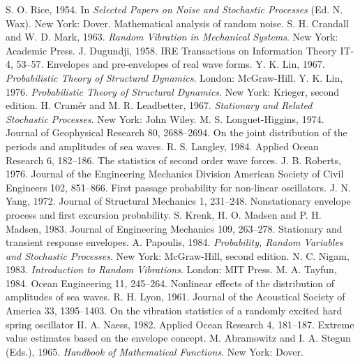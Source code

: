 \documentclass[12pt]{article}
\theoremstyle{plain}
\theoremstyle{definition}
\theoremstyle{remark}
\begin{document}
\begin{thebibliography}{99}
 S. O. Rice, 1954. In \textit{Selected Papers on Noise and Stochastic Processes} (Ed. N. Wax). New York: Dover. Mathematical analysis of random noise.
 S. H. Crandall and W. D. Mark, 1963. \textit{Random Vibration in Mechanical Systems}. New York: Academic Press.
 J. Dugundji, 1958. IRE Transactions on Information Theory IT-4, 53--57. Envelopes and pre-envelopes of real wave forms.
 Y. K. Lin, 1967. \textit{Probabilistic Theory of Structural Dynamics}. London: McGraw-Hill.
 Y. K. Lin, 1976. \textit{Probabilistic Theory of Structural Dynamics}. New York: Krieger, second edition.
 H. Cramér and M. R. Leadbetter, 1967. \textit{Stationary and Related Stochastic Processes}. New York: John Wiley.
 M. S. Longuet-Higgins, 1974. Journal of Geophysical Research 80, 2688--2694. On the joint distribution of the periods and amplitudes of sea waves.
 R. S. Langley, 1984. Applied Ocean Research 6, 182--186. The statistics of second order wave forces.
 J. B. Roberts, 1976. Journal of the Engineering Mechanics Division American Society of Civil Engineers 102, 851--866. First passage probability for non-linear oscillators.
 J. N. Yang, 1972. Journal of Structural Mechanics 1, 231--248. Nonstationary envelope process and first excursion probability.
 S. Krenk, H. O. Madsen and P. H. Madsen, 1983. Journal of Engineering Mechanics 109, 263--278. Stationary and transient response envelopes.
 A. Papoulis, 1984. \textit{Probability, Random Variables and Stochastic Processes}. New York: McGraw-Hill, second edition.
 N. C. Nigam, 1983. \textit{Introduction to Random Vibrations}. London: MIT Press.
 M. A. Tayfun, 1984. Ocean Engineering 11, 245--264. Nonlinear effects of the distribution of amplitudes of sea waves.
 R. H. Lyon, 1961. Journal of the Acoustical Society of America 33, 1395--1403. On the vibration statistics of a randomly excited hard spring oscillator II.
 A. Naess, 1982. Applied Ocean Research 4, 181--187. Extreme value estimates based on the envelope concept.
 M. Abramowitz and I. A. Stegun (Eds.), 1965. \textit{Handbook of Mathematical Functions}. New York: Dover.
\end{thebibliography}
\end{document}
